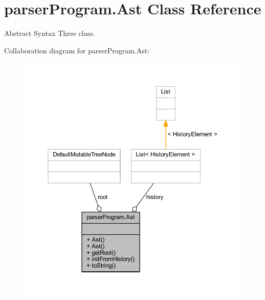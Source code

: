 \hypertarget{classparser_program_1_1_ast}{\section{parser\-Program.\-Ast Class Reference}
\label{classparser_program_1_1_ast}
}


Abstract Syntax Three class.  




Collaboration diagram for parser\-Program.\-Ast\-:
\nopagebreak
\begin{figure}[H]
\begin{center}
\leavevmode
\includegraphics[width=350pt]{classparser_program_1_1_ast__coll__graph}
\end{center}
\end{figure}
